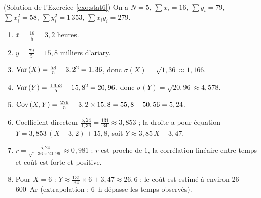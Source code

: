 \begin{corrige}
\begin{sol} ~ \\
(Solution de l'Exercice \ref{exo:stat6})
On a $N = 5$, $\sum x_i = 16$, $\sum y_i = 79$, $\sum x_i^2 = 58$, $\sum y_i^2 = 1\,353$, $\sum x_i y_i = 279$.
\begin{enumerate}
\item $\bar{x} = \frac{16}{5} = 3,2$ heures.
\item $\bar{y} = \frac{79}{5} = 15,8$ milliers d'ariary.
\item $\mathrm{Var}\left( X \right) = \frac{58}{5} - 3,2^2 = 1,36$, donc $\sigma(X) = \sqrt{1,36} \approx 1,166$.
\item $\mathrm{Var}\left( Y \right) = \frac{1\,353}{5} - 15,8^2 = 20,96$, donc $\sigma(Y) = \sqrt{20,96} \approx 4,578$.
\item $\mathrm{Cov}\left( X , Y \right) = \frac{279}{5} - 3,2 \times 15,8 = 55,8 - 50,56 = 5,24$.
\item Coefficient directeur $\frac{5,24}{1,36} = \frac{131}{34} \approx 3,853$ ; 
      la droite a pour \'equation $Y = 3,853\,(X - 3,2) + 15,8$, soit $Y \approx 3,85\,X + 3,47$.
\item $r = \frac{5,24}{\sqrt{1,36 \times 20,96}} \approx 0,981$ : $r$ est proche de $1$, 
      la corr\'elation lin\'eaire entre temps et co\^ut est forte et positive.
\item Pour $X = 6$ : $Y \approx \frac{131}{34}\times 6 + 3,47 \approx 26,6$ ; le co\^ut est estim\'e \`a environ 26\,600~Ar
      (extrapolation : 6~h d\'epasse les temps observ\'es).
\end{enumerate}
\end{sol}


\end{corrige}
